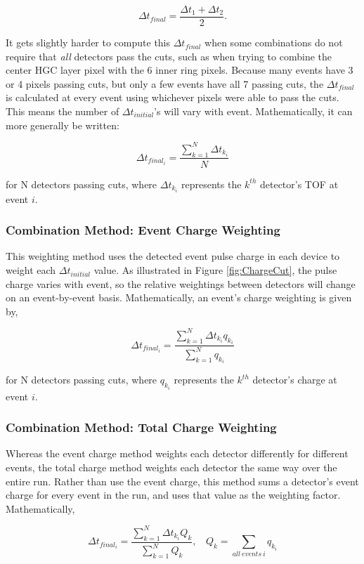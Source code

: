 \documentclass[12pt]{article}
\begin{document}
\[
\Delta t_{final} =
\dfrac{\Delta t_1 + \Delta t_2}{2} .
\]

It gets slightly harder to compute this $\Delta t_{final}$ when some combinations do not require that \textit{all} detectors pass the cuts, such as when trying to combine the center HGC layer pixel with the 6 inner ring pixels. 
Because many events have 3 or 4 pixels passing cuts, but only a few events have all 7 passing cuts, the $\Delta t_{final}$ is calculated at every event using whichever pixels were able to pass the cuts. 
This means the number of $\Delta t_{initial}$'s will vary with event. 
Mathematically, it can more generally be written:

\[
\Delta t_{final_i} =
\dfrac{\sum\limits_{k=1}^N \Delta t_{k_i}} {N} 
\]

for N detectors passing cuts, where $\Delta t_{k_i}$ represents the $k^{th}$ detector's TOF at event $i$.

\subsubsection{Combination Method: Event Charge Weighting}
This weighting method uses the detected event pulse charge in each device to weight each $\Delta t_{initial}$ value. 
As illustrated in Figure \ref{fig:ChargeCut}, the pulse charge varies with event, so the relative weightings between detectors will change on an event-by-event basis. 
Mathematically, an event's charge weighting is given by,

\[
\Delta t_{final_i} =
\dfrac{\sum\limits_{k=1}^N \Delta t_{k_i} q_{k_i} }
	{\sum\limits_{k=1}^N q_{k_i} }
\]

for N detectors passing cuts, where $q_{k_i}$ represents the $k^{th}$ detector's charge at event $i$.

\subsubsection{Combination Method: Total Charge Weighting}
Whereas the event charge method weights each detector differently for different events, the total charge method weights each detector the same way over the entire run. 
Rather than use the event charge, this method sums a detector's event charge for every event in the run, and uses that value as the weighting factor. 
Mathematically,

\[
\Delta t_{final_i} =
\dfrac{\sum\limits_{k=1}^N \Delta t_{k_i} Q_k }
	{\sum\limits_{k=1}^N Q_k }
,\ \ \ \ 
Q_k = \sum_{all\ events\ i} q_{k_i}
\]
\end{document}

